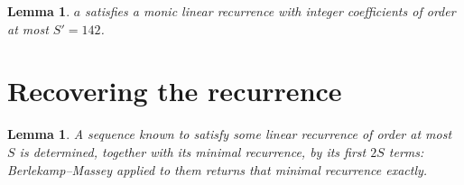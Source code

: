 \documentclass[11pt,a4paper]{article}
\theoremstyle{plain}
\newtheorem{lemma}[theorem]{Lemma}
\theoremstyle{definition}
\begin{document}
\begin{lemma}\label{lem:cf}
$a$ satisfies a monic linear recurrence with integer coefficients of order at most
$S'=142$.
\end{lemma}

\section{Recovering the recurrence}

\begin{lemma}\label{lem:bm}
A sequence known to satisfy some linear recurrence of order at most $S$ is determined, together
with its minimal recurrence, by its first $2S$ terms: Berlekamp--Massey applied to them returns
that minimal recurrence exactly.
\end{lemma}
\end{document}
